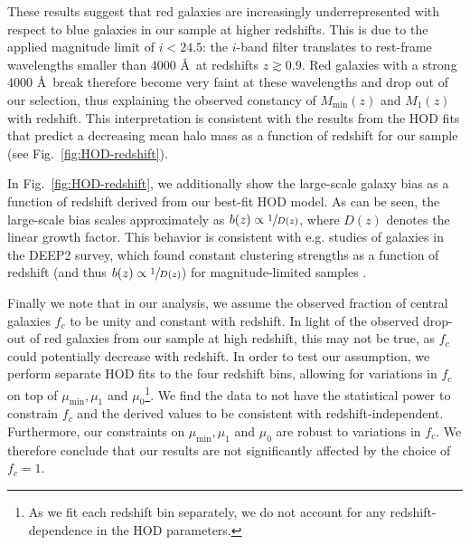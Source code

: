 \documentclass[a4paper,11pt]{article}
\begin{document}
      These results suggest that red galaxies are increasingly underrepresented with respect to blue galaxies in our sample at higher redshifts. This is due to the applied magnitude limit of $i < 24.5$: the $i$-band filter translates to rest-frame wavelengths smaller than $4000$ \AA \, at redshifts $z \gtrsim 0.9$. Red galaxies with a strong $4000$ \AA \, break therefore become very faint at these wavelengths and drop out of our selection, thus explaining the observed constancy of $M_{\mathrm{min}}(z)$ and $M_{1}(z)$ with redshift. This interpretation is consistent with the results from the HOD fits that predict a decreasing mean halo mass as a function of redshift for our sample (see Fig.~\ref{fig:HOD-redshift}).

      In Fig.~\ref{fig:HOD-redshift}, we additionally show the large-scale galaxy bias as a function of redshift derived from our best-fit HOD model. As can be seen, the large-scale bias scales approximately as $b(z) \propto \sfrac{1}{D(z)}$, where $D(z)$ denotes the linear growth factor. This behavior is consistent with e.g. studies of galaxies in the DEEP2 survey, which found constant clustering strengths as a function of redshift (and thus $b(z) \propto \sfrac{1}{D(z)}$) for magnitude-limited samples \cite{Coil:2004}.
      
Finally we note that in our analysis, we assume the observed fraction of central galaxies $f_{c}$ to be unity and constant with redshift. In light of the observed drop-out of red galaxies from our sample at high redshift, this may not be true, as $f_{c}$ could potentially decrease with redshift. In order to test our assumption, we perform separate HOD fits to the four redshift bins, allowing for variations in $f_{c}$ on top of $\mu_{\mathrm{min}}, \mu_{1}$ and $\mu_{0}$\footnote{As we fit each redshift bin separately, we do not account for any redshift-dependence in the HOD parameters.}. We find the data to not have the statistical power to constrain $f_{c}$ and the derived values to be consistent with redshift-independent. Furthermore, our constraints on $\mu_{\mathrm{min}}, \mu_{1}$ and $\mu_{0}$ are robust to variations in $f_{c}$. We therefore conclude that our results are not significantly affected by the choice of $f_{c}=1$.  
\end{document}
